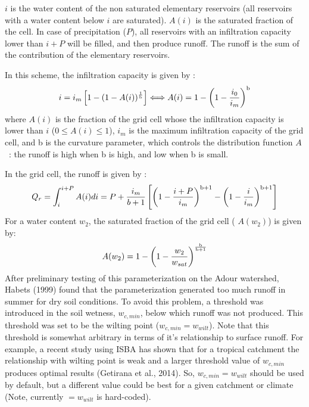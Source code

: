 $i$ is the water content of the non saturated elementary reservoirs (all reservoirs
with a water content below $i$ are saturated). $A(i)$ is the saturated fraction of the cell.
In case of precipitation ($P$), all reservoirs with an infiltration capacity lower than $i + P$
will be filled, and then produce runoff. The runoff is the sum of the contribution of the elementary reservoirs.

In this scheme, the infiltration capacity is given by : 
%
\begin{equation}
\label{eq:i_m_vic_model}
  i=i_m \left[ 1- (1-A(i))^{\frac{1}{{\rm b}}} \right]  \Longleftrightarrow A(i)=1- \left( 1- \frac{i_0}{i_m}\right)^{\rm b}
\end{equation}
%
where $A(i)$ is the fraction of the grid cell whose the infiltration capacity is
lower than $i$ ($0 \le A(i) \le 1$), $i_m$ is the
maximum infiltration capacity of the grid cell, and b is the curvature
parameter, which controls the distribution function $A$~:
the runoff is high when b is high, and low when b is small. 

In the grid cell, the runoff is given by :
%
\begin{equation}
  Q_r = \int_{i}^{i+P} A(i) di = P + \frac{i_m}{b+1} \left[  \left( 1-
      \frac{i+P}{i_m} \right)^{{\rm b}+1} - \left( 1- \frac{i}{i_m}
    \right)^{{\rm b}+1} \right]
\end{equation}
%
For a water content $w_2$, the saturated fraction of the grid cell (
$A(w_2)$) is given by:
%
\begin{equation}
\label{eq:a_vic_model}
  A(w_2) = 1 - \left( 1 - \frac{w_2}{w_{sat}} \right)^{\frac{{\rm b}}{{\rm b}+1}}
\end{equation}
%
After preliminary testing of this parameterization on the Adour watershed, Habets \etal (1999)
found that the parameterization generated too much runoff in summer for dry
soil conditions. To avoid this problem, a threshold was introduced in
the soil wetness, $w_{c,min}$,
below which runoff was not produced. This threshold was set to be the wilting point
($w_{c,min}=w_{wilt}$). Note that this threshold is somewhat arbitrary in terms
of it's relationship to surface runoff. For example, a recent study
using ISBA has shown
that for a tropical catchment the relationship with wilting point is
weak
and a larger threshold value of $w_{c,min}$ produces
optimal results (Getirana et al., 2014\nocite{getirana_ea_2014}). So, $w_{c,min}=w_{wilt}$ should be
used by default, but a different value could be best for a given
catchment or climate (Note, currently $=w_{wilt}$ is hard-coded).


